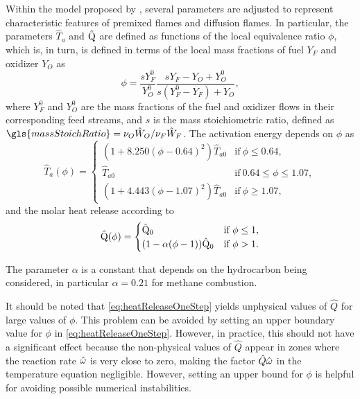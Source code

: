Within the model proposed by \textcite{fernandez-tarrazoSimpleOnestepChemistry2006}, several parameters are adjusted to represent characteristic features of premixed flames and diffusion flames. In particular, the parameters $\hat T_a$ and $\hat {\mathrm{Q}}$ are defined as functions of the local equivalence ratio $\phi$, which is, in turn, is defined in terms of the local mass fractions of fuel $Y_F$ and oxidizer $Y_O$ as
\begin{equation}\label{eq:equivalenceRatio}
	\phi = \frac{s Y_F^0}{Y_O^0}\frac{s Y_F-Y_O+Y_O^0}{s(Y_F^0-Y_F) + Y_O},
\end{equation}
where $Y_F^0$ and $Y_O^0$ are the mass fractions of the fuel and oxidizer flows in their corresponding feed streams, and $s$ is the mass stoichiometric ratio, defined as $\gls{massStoichRatio} =\nu_O \hat W_O/\nu_F \hat W_F$.
The activation energy depends on $\phi$ as
\begin{equation}
	\hat{T}_a(\phi)=
	\begin{cases}
		(1 + 8.250(\phi-0.64)^2) \hat{T}_{a0} & \text{if}~ 	\phi \leq 0.64,           \\
		\hat{T}_{a0}                          & \text{if}~ 	0.64 \leq \phi \leq 1.07, \\
		(1 + 4.443(\phi-1.07)^2)\hat{T}_{a0}  & \text{if}~\phi \geq 1.07,
	\end{cases} \label{eq:ActivationTemperatureOneStep}
\end{equation}
and the molar heat release according to
\begin{equation}
	\hat{\mathrm{Q}}(\phi)=
	\begin{cases}
		\hat{\mathrm{Q}}_0                      & \text{if}~ \phi \leq 1, \\
		(1 - \alpha(\phi -1))\hat{\mathrm{Q}}_0 & \text{if}~\phi > 1.
	\end{cases}  \label{eq:heatReleaseOneStep}
\end{equation}

The parameter $\alpha$ is a constant that depends on the hydrocarbon being considered, in particular $\alpha = 0.21$ for methane combustion.

It should be noted that \cref{eq:heatReleaseOneStep} yields unphysical values of $\hat Q$ for large values of $\phi$. This problem can be avoided by setting an upper boundary value for $\phi$ in \cref{eq:heatReleaseOneStep}. However, in practice, this should not have a significant effect because the non-physical values of $\hat Q$ appear in zones where the reaction rate $\hat{\omega}$ is very close to zero, making the factor $\hat Q \hat{\omega}$ in the temperature equation negligible. However, setting an upper bound for $\phi$ is helpful for avoiding possible numerical instabilities.

